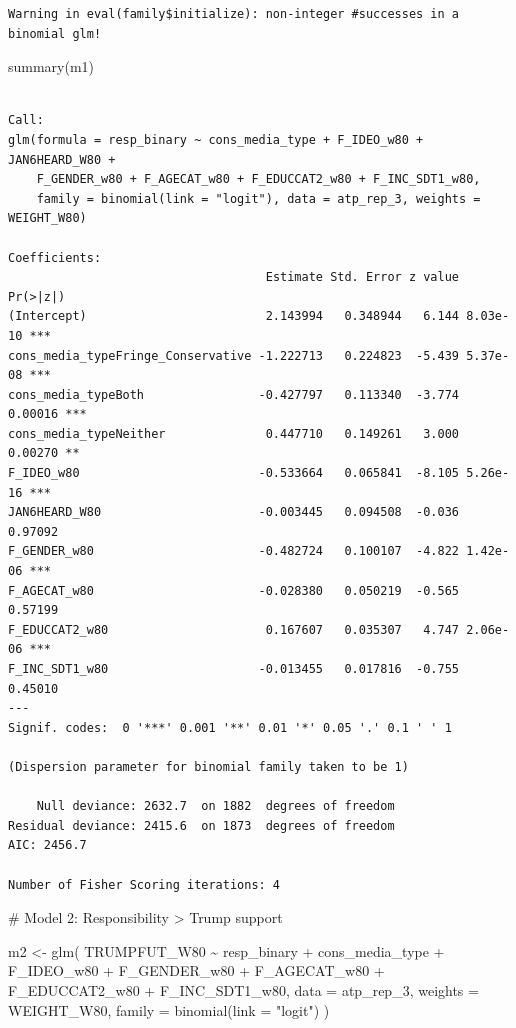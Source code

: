 \documentclass[
  letterpaper,
  DIV=11,
  numbers=noendperiod]{scrartcl}
\newenvironment{Shaded}{\begin{snugshade}}{\end{snugshade}}
\newcommand{\AttributeTok}[1]{\textcolor[rgb]{0.40,0.45,0.13}{#1}}
\newcommand{\CommentTok}[1]{\textcolor[rgb]{0.37,0.37,0.37}{#1}}
\newcommand{\FunctionTok}[1]{\textcolor[rgb]{0.28,0.35,0.67}{#1}}
\newcommand{\NormalTok}[1]{\textcolor[rgb]{0.00,0.23,0.31}{#1}}
\newcommand{\OtherTok}[1]{\textcolor[rgb]{0.00,0.23,0.31}{#1}}
\newcommand{\SpecialCharTok}[1]{\textcolor[rgb]{0.37,0.37,0.37}{#1}}
\newcommand{\StringTok}[1]{\textcolor[rgb]{0.13,0.47,0.30}{#1}}
\begin{document}
\begin{verbatim}
Warning in eval(family$initialize): non-integer #successes in a binomial glm!
\end{verbatim}

\begin{Shaded}
\begin{Highlighting}[]
\FunctionTok{summary}\NormalTok{(m1) }
\end{Highlighting}
\end{Shaded}

\begin{verbatim}

Call:
glm(formula = resp_binary ~ cons_media_type + F_IDEO_w80 + JAN6HEARD_W80 + 
    F_GENDER_w80 + F_AGECAT_w80 + F_EDUCCAT2_w80 + F_INC_SDT1_w80, 
    family = binomial(link = "logit"), data = atp_rep_3, weights = WEIGHT_W80)

Coefficients:
                                    Estimate Std. Error z value Pr(>|z|)    
(Intercept)                         2.143994   0.348944   6.144 8.03e-10 ***
cons_media_typeFringe_Conservative -1.222713   0.224823  -5.439 5.37e-08 ***
cons_media_typeBoth                -0.427797   0.113340  -3.774  0.00016 ***
cons_media_typeNeither              0.447710   0.149261   3.000  0.00270 ** 
F_IDEO_w80                         -0.533664   0.065841  -8.105 5.26e-16 ***
JAN6HEARD_W80                      -0.003445   0.094508  -0.036  0.97092    
F_GENDER_w80                       -0.482724   0.100107  -4.822 1.42e-06 ***
F_AGECAT_w80                       -0.028380   0.050219  -0.565  0.57199    
F_EDUCCAT2_w80                      0.167607   0.035307   4.747 2.06e-06 ***
F_INC_SDT1_w80                     -0.013455   0.017816  -0.755  0.45010    
---
Signif. codes:  0 '***' 0.001 '**' 0.01 '*' 0.05 '.' 0.1 ' ' 1

(Dispersion parameter for binomial family taken to be 1)

    Null deviance: 2632.7  on 1882  degrees of freedom
Residual deviance: 2415.6  on 1873  degrees of freedom
AIC: 2456.7

Number of Fisher Scoring iterations: 4
\end{verbatim}

\begin{Shaded}
\begin{Highlighting}[]
\CommentTok{\# Model 2: Responsibility \textgreater{} Trump support}

\NormalTok{m2 }\OtherTok{\textless{}{-}} \FunctionTok{glm}\NormalTok{(}
\NormalTok{  TRUMPFUT\_W80 }\SpecialCharTok{\textasciitilde{}}\NormalTok{ resp\_binary }\SpecialCharTok{+}\NormalTok{ cons\_media\_type }\SpecialCharTok{+}\NormalTok{ F\_IDEO\_w80 }\SpecialCharTok{+}
\NormalTok{    F\_GENDER\_w80 }\SpecialCharTok{+}\NormalTok{ F\_AGECAT\_w80 }\SpecialCharTok{+}\NormalTok{ F\_EDUCCAT2\_w80 }\SpecialCharTok{+}\NormalTok{ F\_INC\_SDT1\_w80,}
  \AttributeTok{data =}\NormalTok{ atp\_rep\_3,}
  \AttributeTok{weights =}\NormalTok{ WEIGHT\_W80,}
  \AttributeTok{family =} \FunctionTok{binomial}\NormalTok{(}\AttributeTok{link =} \StringTok{"logit"}\NormalTok{)}
\NormalTok{)}
\end{Highlighting}
\end{Shaded}
\end{document}

